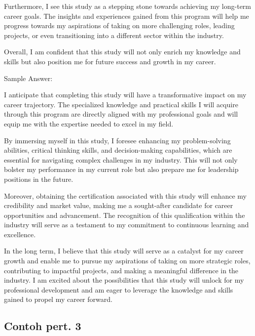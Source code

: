 \documentclass[../main.tex]{subfiles}
\begin{document}
Furthermore, I see this study as a stepping stone towards achieving my long-term career goals. The insights and experiences gained from this program will help me progress towards my aspirations of taking on more challenging roles, leading projects, or even transitioning into a different sector within the industry.

Overall, I am confident that this study will not only enrich my knowledge and skills but also position me for future success and growth in my career.

Sample Answer:

I anticipate that completing this study will have a transformative impact on my career trajectory. The specialized knowledge and practical skills I will acquire through this program are directly aligned with my professional goals and will equip me with the expertise needed to excel in my field.

By immersing myself in this study, I foresee enhancing my problem-solving abilities, critical thinking skills, and decision-making capabilities, which are essential for navigating complex challenges in my industry. This will not only bolster my performance in my current role but also prepare me for leadership positions in the future.

Moreover, obtaining the certification associated with this study will enhance my credibility and market value, making me a sought-after candidate for career opportunities and advancement. The recognition of this qualification within the industry will serve as a testament to my commitment to continuous learning and excellence.

In the long term, I believe that this study will serve as a catalyst for my career growth and enable me to pursue my aspirations of taking on more strategic roles, contributing to impactful projects, and making a meaningful difference in the industry. I am excited about the possibilities that this study will unlock for my professional development and am eager to leverage the knowledge and skills gained to propel my career forward.

\subsection{Contoh pert. 3}%
\label{sub:Contoh pert. 3}
\end{document}
